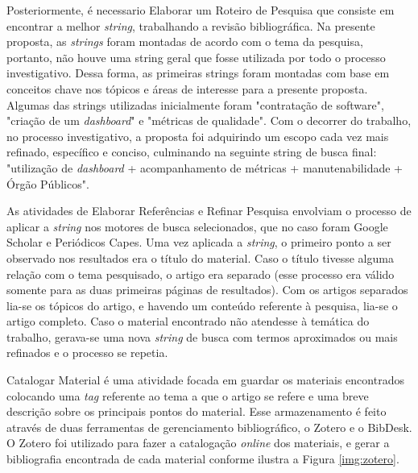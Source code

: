 Posteriormente, é necessario Elaborar um Roteiro de Pesquisa  que consiste em encontrar a melhor \textit{string}, trabalhando a revisão bibliográfica. Na presente proposta, as \textit{strings} foram montadas de acordo com o tema da pesquisa, portanto, não houve uma string geral que fosse utilizada por todo o processo investigativo. Dessa forma, as primeiras strings foram montadas com base em conceitos chave nos tópicos e áreas de interesse para a presente proposta. Algumas das strings utilizadas inicialmente foram "contratação de software", "criação de um \textit{dashboard}" e "métricas de qualidade". Com o decorrer do trabalho, no processo investigativo, a proposta foi adquirindo um escopo cada vez mais refinado, específico e conciso, culminando na seguinte string de busca final: "utilização de \textit{dashboard} + acompanhamento de métricas + manutenabilidade + Órgão Públicos". 

As atividades de Elaborar Referências e Refinar Pesquisa envolviam o processo de aplicar a \textit{string} nos motores de busca selecionados, que no caso foram Google Scholar e Periódicos Capes. Uma vez aplicada a \textit{string}, o primeiro ponto a ser observado nos resultados era o título do material. Caso o título tivesse alguma relação com o tema pesquisado, o artigo era separado (esse processo era válido somente para as duas primeiras páginas de resultados). Com os artigos separados lia-se os tópicos do artigo, e havendo um conteúdo referente à pesquisa, lia-se o artigo completo. Caso o  material encontrado não atendesse à temática do trabalho, gerava-se uma nova \textit{string} de busca com termos aproximados ou mais refinados e o processo se repetia.

Catalogar Material é uma atividade focada em guardar os materiais encontrados colocando uma  \textit{tag} referente ao tema a que o artigo se refere e uma breve descrição sobre os principais pontos do material. Esse armazenamento é feito através de duas ferramentas de gerenciamento bibliográfico, o Zotero e o BibDesk. O Zotero foi utilizado para fazer a catalogação \textit{online} dos materiais, e gerar a bibliografia encontrada de cada material conforme ilustra a Figura \ref{img:zotero}.

